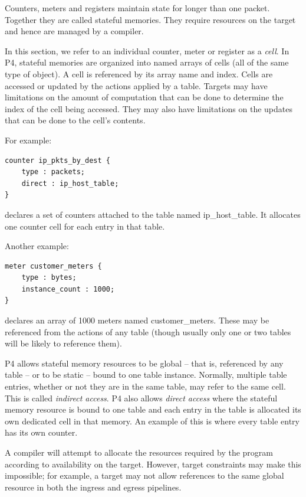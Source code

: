 \documentclass[12pt]{article}
\begin{document}

Counters, meters and registers maintain state for longer than one packet. 
Together they are called stateful memories. They require resources on the 
target and hence are managed by a compiler.

In this section, we refer to an individual counter, meter or register as a 
\textit{cell}. In P4, stateful memories are organized into named arrays of cells 
(all of the same type of object). A cell is referenced by its array name and 
index. Cells are accessed or updated by the actions applied by a table. Targets 
may have limitations on the amount of computation that can be done to determine 
the index of the cell being accessed.  They may also have limitations on 
the updates that can be done to the cell's contents.

For example:

\begin{lstlisting}[style=P4style]
counter ip_pkts_by_dest {
    type : packets;
    direct : ip_host_table;
}
\end{lstlisting}


declares a set of counters attached to the table named ip_host_table. It 
allocates one counter cell for each entry in that table.

Another example:

\begin{lstlisting}[style=P4style]
meter customer_meters {
    type : bytes;
    instance_count : 1000;
}
\end{lstlisting}


declares an array of 1000 meters named customer_meters. These may be referenced 
from the actions of any table (though usually only one or two tables will 
be likely to reference them).

P4 allows stateful memory resources to be global -- that is, referenced by 
any table -- or to be static -- bound to one table instance. Normally, multiple 
table entries, whether or not they are in the same table, may refer to the 
same cell. This is called \textit{indirect access}. P4 also allows \textit{direct access} where 
the stateful memory resource is bound to one table and each entry in the table 
is allocated its own dedicated cell in that memory. An example of this is 
where every table entry has its own counter.

A compiler will attempt to allocate the resources required by the program 
according to availability on the target. However, target constraints may make 
this impossible; for example, a target may not allow references to the same 
global resource in both the ingress and egress pipelines.
\end{document}
